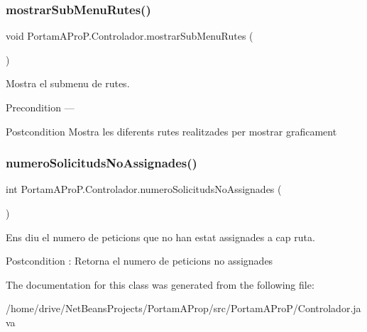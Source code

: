 \subsubsection{\texorpdfstring{mostrar\+Sub\+Menu\+Rutes()}{mostrarSubMenuRutes()}}
{\footnotesize\ttfamily void Portam\+A\+Pro\+P.\+Controlador.\+mostrar\+Sub\+Menu\+Rutes (\begin{DoxyParamCaption}{ }\end{DoxyParamCaption})}



Mostra el submenu de rutes. 

\begin{DoxyPrecond}{Precondition}
--- 
\end{DoxyPrecond}
\begin{DoxyPostcond}{Postcondition}
Mostra les diferents rutes realitzades per mostrar graficament 
\end{DoxyPostcond}
\mbox{\label{class_portam_a_pro_p_1_1_controlador_ab96141c7e6641af02d4498c35b236f7b}} 
\subsubsection{\texorpdfstring{numero\+Solicituds\+No\+Assignades()}{numeroSolicitudsNoAssignades()}}
{\footnotesize\ttfamily int Portam\+A\+Pro\+P.\+Controlador.\+numero\+Solicituds\+No\+Assignades (\begin{DoxyParamCaption}{ }\end{DoxyParamCaption})}



Ens diu el numero de peticions que no han estat assignades a cap ruta. 

\begin{DoxyPostcond}{Postcondition}
\+: Retorna el numero de peticions no assignades 
\end{DoxyPostcond}


The documentation for this class was generated from the following file\+:\begin{DoxyCompactItemize}
\item 
/home/drive/\+Net\+Beans\+Projects/\+Portam\+A\+Prop/src/\+Portam\+A\+Pro\+P/Controlador.\+java\end{DoxyCompactItemize}
